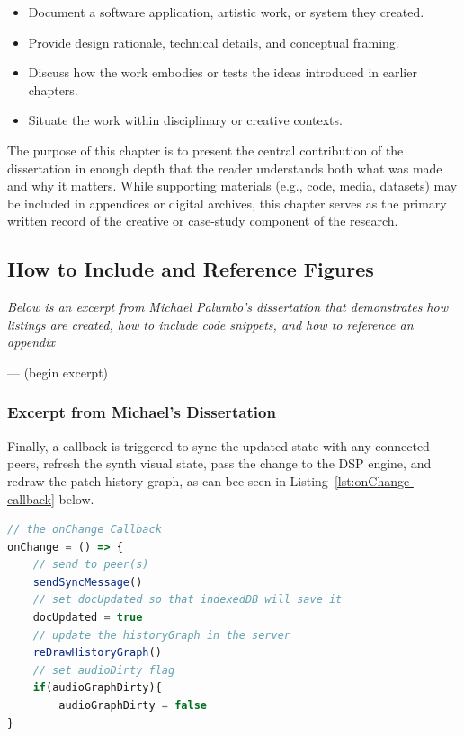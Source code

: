 \documentclass[12pt]{yorkudiss}
\begin{document}
\begin{itemize}
    \item Document a software application, artistic work, or system they created.  
    \item Provide design rationale, technical details, and conceptual framing.  
    \item Discuss how the work embodies or tests the ideas introduced in earlier chapters.  
    \item Situate the work within disciplinary or creative contexts.  
\end{itemize}

The purpose of this chapter is to present the central contribution of the dissertation in enough depth that the reader understands both what was made and why it matters. While supporting materials (e.g., code, media, datasets) may be included in appendices or digital archives, this chapter serves as the primary written record of the creative or case-study component of the research.  

\subsection{How to Include and Reference Figures}
\textit{Below is an excerpt from Michael Palumbo's dissertation that demonstrates how listings are created, how to include code snippets, and how to reference an appendix}

--- (begin excerpt)

\subsubsection{Excerpt from Michael's Dissertation}
Finally, a callback is triggered to sync the updated state with any connected peers, refresh the synth visual state, pass the change to the DSP engine, and redraw the patch history graph, as can bee seen in Listing~\ref{lst:onChange-callback} below. 

\begin{lstlisting}[language=JavaScript, caption={The onChange callback is triggered after a successful \texttt{patchHistory} document update within the function \texttt{applyChange()}. It handles peer synchronization, flags the document for saving to IndexedDB, updates the server-rendered history graph, and clears the audio dirty flag if needed.}, label={lst:onChange-callback}]
// the onChange Callback
onChange = () => {
    // send to peer(s)
    sendSyncMessage()
    // set docUpdated so that indexedDB will save it
    docUpdated = true
    // update the historyGraph in the server
    reDrawHistoryGraph()
    // set audioDirty flag
    if(audioGraphDirty){
        audioGraphDirty = false
}

\end{lstlisting}
\end{document}
